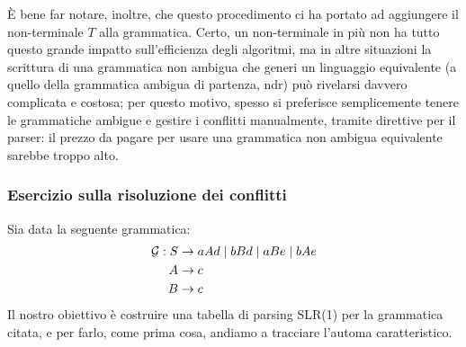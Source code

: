 \documentclass[class=book, crop=false, oneside, 12pt]{standalone}
\begin{document}
È bene far notare, inoltre, che questo procedimento ci ha portato ad aggiungere il non-terminale \(T\) alla grammatica. Certo, un non-terminale in più non ha tutto questo grande impatto sull'efficienza degli algoritmi, ma in altre situazioni la scrittura di una grammatica non ambigua che generi un linguaggio equivalente (a quello della grammatica ambigua di partenza, ndr) può rivelarsi davvero complicata e costosa; per questo motivo, spesso si preferisce semplicemente tenere le grammatiche ambigue e gestire i conflitti manualmente, tramite direttive per il parser: il prezzo da pagare per usare una grammatica non ambigua equivalente sarebbe troppo alto.

\subsubsection{Esercizio sulla risoluzione dei conflitti}
Sia data la seguente grammatica:
\begin{align}
    \label{eq:ex3-slr1-grammar}
    \mathcal{G}: S &\to aAd \mid bBd \mid aBe \mid bAe \\
    A &\to c \nonumber \\ \notag
    B &\to c \notag
\end{align}
Il nostro obiettivo è costruire una tabella di parsing SLR(1) per la grammatica citata, e per farlo, come prima cosa, andiamo a tracciare l'automa caratteristico.
\end{document}
